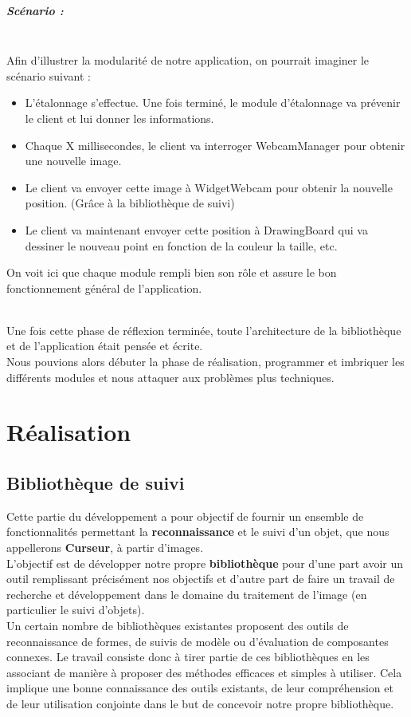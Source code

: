 \documentclass{report}
\begin{document}
				\paragraph{Scénario :} \ \\
				Afin d'illustrer la modularité de notre application, on pourrait imaginer le scénario suivant :
				\begin{itemize}
					\item L'étalonnage s'effectue. Une fois terminé, le module d'étalonnage va prévenir le client et lui donner les informations.
					\item Chaque X millisecondes, le client va interroger WebcamManager pour obtenir une nouvelle image.
					\item Le client va envoyer cette image à WidgetWebcam pour obtenir la nouvelle position. (Grâce à la bibliothèque de suivi)
					\item Le client va maintenant envoyer cette position à DrawingBoard qui va dessiner le nouveau point en fonction de la couleur la taille, etc.
				\end{itemize}
				On voit ici que chaque module rempli bien son rôle et assure le bon fonctionnement général de l'application.
				
				$$$$ \\
				Une fois cette phase de réflexion terminée, toute l'architecture de la bibliothèque et de l'application était pensée et écrite. \\
				Nous pouvions alors débuter la phase de réalisation, programmer et imbriquer les différents modules et  nous attaquer aux problèmes plus techniques.

				
	
	\chapter{Réalisation}
		\section{Bibliothèque de suivi}
			Cette partie du développement a pour objectif de fournir un ensemble de fonctionnalités permettant la \textbf{reconnaissance} et le suivi d'un objet, que nous appellerons \textbf{Curseur}, à partir d'images. \\
			L'objectif est de développer notre propre \textbf{bibliothèque} pour d'une part avoir un outil remplissant précisément nos objectifs et d'autre part de faire un travail de recherche et développement dans le domaine du traitement de l'image (en particulier le suivi d'objets). \\
			Un certain nombre de bibliothèques existantes proposent des outils de reconnaissance de formes, de suivis de modèle ou d'évaluation de composantes connexes. Le travail consiste donc à tirer partie de ces bibliothèques en les associant de manière à proposer des méthodes efficaces et simples à utiliser. Cela implique une bonne connaissance des outils existants, de leur compréhension et de leur utilisation conjointe dans le but de concevoir notre propre bibliothèque.
			\newpage
\end{document}
